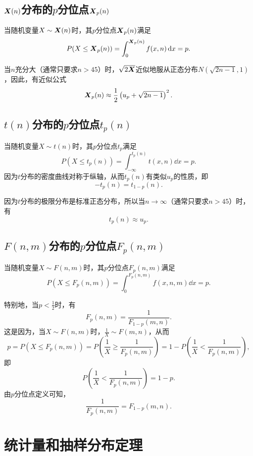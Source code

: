 \subsection{\texorpdfstring{\(\boldsymbol{X}(n)\)分布的\(p\)分位点\(\boldsymbol{X}_p(n)\)}{卡方分布的p分位点}}
当随机变量\(X \sim \boldsymbol{X}(n)\)时，其\(p\)分位点\(\boldsymbol{X}_p(n)\)满足\[
P(X \leq \boldsymbol{X}_p(n)) = \int_0^{\boldsymbol{X}_p(n)} f(x,n) \dd{x} = p.
\]

当\(n\)充分大（通常只要求\(n>45\)）时，\(\sqrt{2\boldsymbol{X}}\)近似地服从正态分布\(N(\sqrt{2n-1},1)\)，因此，有近似公式\begin{equation}
\boldsymbol{X}_p(n) \approx \frac{1}{2}\left(u_p+\sqrt{2n-1}\right)^2.
\end{equation}

\subsection{\texorpdfstring{\(t(n)\)分布的\(p\)分位点\(t_p(n)\)}{t分布的p分位点}}
当随机变量\(X \sim t(n)\)时，其\(p\)分位点\(t_p\)满足\[
P(X \leq t_p(n))
= \int_{-\infty}^{t_p(n)} t(x,n) \dd{x} = p.
\]因为\(t\)分布的密度曲线对称于纵轴，从而\(t_p(n)\)有类似\(u_p\)的性质，即\begin{equation}
-t_p(n)=t_{1-p}(n).
\end{equation}

因为\(t\)分布的极限分布是标准正态分布，所以当\(n\to\infty\)（通常只要求\(n>45\)）时，有\[
t_p(n) \approx u_p.
\]

\subsection{\texorpdfstring{\(F(n,m)\)分布的\(p\)分位点\(F_p(n,m)\)}{F分布的p分位点}}
当随机变量\(X \sim F(n,m)\)时，其\(p\)分位点\(F_p(n,m)\)满足\[
P(X \leq F_p(n,m)) = \int_0^{F_p(n,m)} f(x,n,m) \dd{x} = p.
\]

特别地，当\(p<\frac{1}{2}\)时，有\begin{equation}
F_p(n,m) = \frac{1}{F_{1-p}(m,n)}.
\end{equation}
这是因为，当\(X \sim F(n,m)\)时，\(\frac{1}{X} \sim F(m,n)\)，从而\[
p = P(X \leq F_p(n,m))
= P\left(\frac{1}{X} \geq \frac{1}{F_p(n,m)}\right)
= 1 - P\left(\frac{1}{X} < \frac{1}{F_p(n,m)}\right),
\]即\[
P\left(\frac{1}{X} < \frac{1}{F_p(n,m)}\right) = 1 - p.
\]由\(p\)分位点定义可知，\[
\frac{1}{F_p(n,m)} = F_{1-p}(m,n).
\]

\section{统计量和抽样分布定理}
